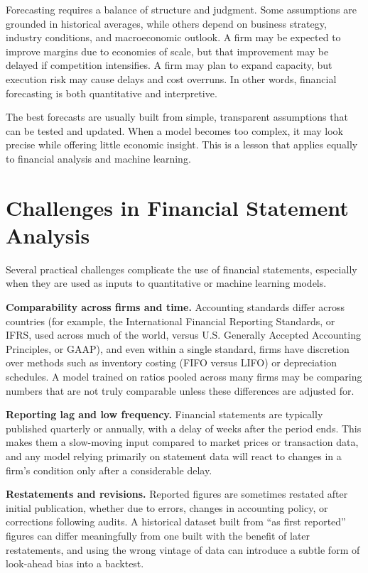 \documentclass[../ai_in_finance]{subfiles}
\begin{document}
Forecasting requires a balance of structure and judgment. Some assumptions are grounded in historical averages, while others depend on business strategy, industry conditions, and macroeconomic outlook. A firm may be expected to improve margins due to economies of scale, but that improvement may be delayed if competition intensifies. A firm may plan to expand capacity, but execution risk may cause delays and cost overruns. In other words, financial forecasting is both quantitative and interpretive.

The best forecasts are usually built from simple, transparent assumptions that can be tested and updated. When a model becomes too complex, it may look precise while offering little economic insight. This is a lesson that applies equally to financial analysis and machine learning.

\section{Challenges in Financial Statement Analysis}

Several practical challenges complicate the use of financial statements, especially when they are used as inputs to quantitative or machine learning models.

\textbf{Comparability across firms and time.} Accounting standards differ across countries (for example, the International Financial Reporting Standards, or IFRS, used across much of the world, versus U.S. Generally Accepted Accounting Principles, or GAAP), and even within a single standard, firms have discretion over methods such as inventory costing (FIFO versus LIFO) or depreciation schedules. A model trained on ratios pooled across many firms may be comparing numbers that are not truly comparable unless these differences are adjusted for.

\textbf{Reporting lag and low frequency.} Financial statements are typically published quarterly or annually, with a delay of weeks after the period ends. This makes them a slow-moving input compared to market prices or transaction data, and any model relying primarily on statement data will react to changes in a firm's condition only after a considerable delay.

\textbf{Restatements and revisions.} Reported figures are sometimes restated after initial publication, whether due to errors, changes in accounting policy, or corrections following audits. A historical dataset built from ``as first reported'' figures can differ meaningfully from one built with the benefit of later restatements, and using the wrong vintage of data can introduce a subtle form of look-ahead bias into a backtest.
\end{document}
